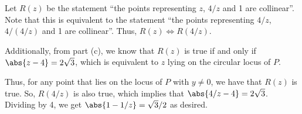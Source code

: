 \begin{solution}
\begin{ppart}
\begin{center}
        \end{center}
    \end{ppart}
    \begin{ppart}
        Let $R(z)$ be the statement ``the points representing $z$, $4/z$ and 1 are collinear''. Note that this is equivalent to the statement ``the points representing $4/z$, $4/(4/z)$ and 1 are collinear''. Thus, $R(z) \iff R(4/z)$.

        Additionally, from part (c), we know that $R(z)$ is true if and only if $\abs{z - 4} = 2\sqrt{3}$, which is equivalent to $z$ lying on the circular locus of $P$.
        
        Thus, for any point that lies on the locus of $P$ with $y \neq 0$, we have that $R(z)$ is true. So, $R(4/z)$ is also true, which implies that $\abs{4/z - 4} = 2\sqrt3$. Dividing by 4, we get $\abs{1 - 1/z} = \sqrt{3}/2$ as desired.
    \end{ppart}
\end{solution}

